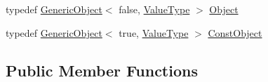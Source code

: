 \begin{DoxyCompactItemize}
\item 
typedef \mbox{\hyperlink{classrapidjson_1_1_generic_object}{Generic\+Object}}$<$ false, \mbox{\hyperlink{classrapidjson_1_1_generic_value_ad2935191ab28c2c2e472b739a9d58202}{Value\+Type}} $>$ \mbox{\hyperlink{classrapidjson_1_1_generic_value_ae1b1a60a9c69ce5ac48b8c445e3e9231}{Object}}
\item 
typedef \mbox{\hyperlink{classrapidjson_1_1_generic_object}{Generic\+Object}}$<$ true, \mbox{\hyperlink{classrapidjson_1_1_generic_value_ad2935191ab28c2c2e472b739a9d58202}{Value\+Type}} $>$ \mbox{\hyperlink{classrapidjson_1_1_generic_value_a39f5e1993897a86741b55c32ed4f54ef}{Const\+Object}}
\end{DoxyCompactItemize}
\subsection*{Public Member Functions}
